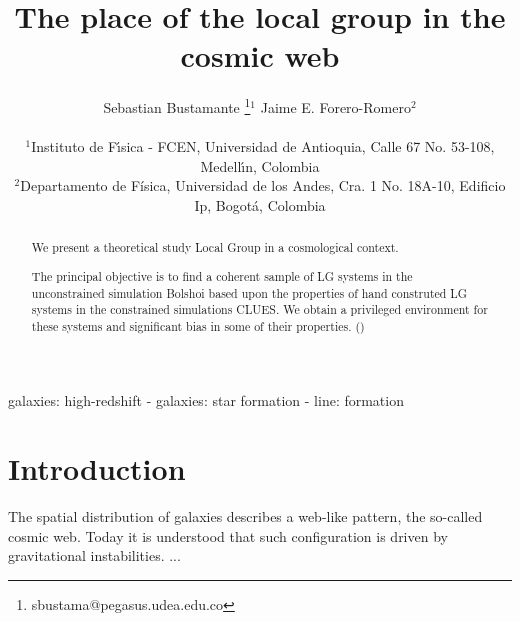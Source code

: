 \documentclass[usenatbib]{latex/mn2e}
\begin{document}
\title[LG Environment]{The place of the local group in the cosmic web}
\author[S. Bustamante and J.E. Forero-Romero]{
\parbox[t]{\textwidth}{\raggedright 
  Sebastian Bustamante \thanks{sbustama@pegasus.udea.edu.co}$^{1}$ 
  Jaime E. Forero-Romero$^{2}$ 
}
\vspace*{6pt}\\
$^1$Instituto de F\'{\i}sica - FCEN, Universidad de Antioquia, Calle
67 No. 53-108, Medell\'{\i}n, Colombia\\ 
$^2$Departamento de F\'{i}sica, Universidad de los Andes, Cra. 1
No. 18A-10, Edificio Ip, Bogot\'a, Colombia
}

\maketitle

\begin{abstract}


We present a theoretical study Local Group in a cosmological context. 

The principal objective is to find a coherent  
sample of LG systems in the unconstrained simulation Bolshoi based upon 
the properties of hand construted LG systems in the constrained 
simulations CLUES. We obtain a privileged environment for these systems 
and significant bias in some of their properties. ()


\end{abstract}

\begin{keywords}
galaxies: high-redshift - galaxies: star formation - line: formation
\end{keywords}



\section{Introduction}
\label{sec:introduction}


The spatial distribution of galaxies describes a web-like pattern, the 
so-called cosmic web. Today it is understood that such configuration
is driven by gravitational instabilities. ...
\end{document}
